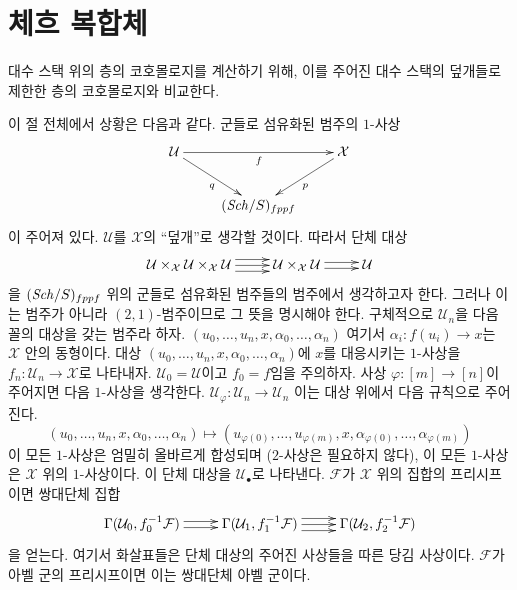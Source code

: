 \section{체흐 복합체}
\label{section-cech}

\noindent
대수 스택 위의 층의 코호몰로지를 계산하기 위해, 이를 주어진
대수 스택의 덮개들로 제한한 층의 코호몰로지와 비교한다.

\medskip\noindent
이 절 전체에서 상황은 다음과 같다. 군들로 섬유화된 범주의
$1$-사상
\begin{equation}
\label{equation-covering}
\vcenter{
\xymatrix{
\mathcal{U} \ar[rr]_f \ar[rd]_q & &  \mathcal{X} \ar[ld]^p \\
& (\Sch/S)_{fppf}
}
}
\end{equation}
이 주어져 있다. $\mathcal{U}$를 $\mathcal{X}$의 ``덮개''로
생각할 것이다. 따라서 단체 대상
$$
\xymatrix{
\mathcal{U} \times_\mathcal{X} \mathcal{U} \times_\mathcal{X} \mathcal{U}
\ar@<1ex>[r]
\ar@<0ex>[r]
\ar@<-1ex>[r]
&
\mathcal{U} \times_\mathcal{X} \mathcal{U}
\ar@<0.5ex>[r]
\ar@<-0.5ex>[r]
&
\mathcal{U}
}
$$
을 $(\mathit{Sch}/S)_{fppf}$ 위의 군들로 섬유화된 범주들의 범주에서
생각하고자 한다. 그러나 이는 범주가 아니라 $(2, 1)$-범주이므로
그 뜻을 명시해야 한다. 구체적으로 $\mathcal{U}_n$을
다음 꼴의 대상을 갖는 범주라 하자.
$(u_0, \ldots, u_n, x, \alpha_0, \ldots, \alpha_n)$
여기서 $\alpha_i : f(u_i) \to x$는 $\mathcal{X}$ 안의 동형이다.
대상 $(u_0, \ldots, u_n, x, \alpha_0, \ldots, \alpha_n)$에
$x$를 대응시키는 $1$-사상을
$f_n : \mathcal{U}_n \to \mathcal{X}$로 나타내자.
$\mathcal{U}_0 = \mathcal{U}$이고 $f_0 = f$임을 주의하자.
사상 $\varphi : [m] \to [n]$이 주어지면 다음 $1$-사상을 생각한다.
$\mathcal{U}_\varphi : \mathcal{U}_n \longrightarrow \mathcal{U}_n$
이는 대상 위에서 다음 규칙으로 주어진다.
$$
(u_0, \ldots, u_n, x, \alpha_0, \ldots, \alpha_n)
\longmapsto
(u_{\varphi(0)}, \ldots, u_{\varphi(m)}, x,
\alpha_{\varphi(0)}, \ldots, \alpha_{\varphi(m)})
$$
이 모든 $1$-사상은 엄밀히 올바르게 합성되며
($2$-사상은 필요하지 않다), 이 모든 $1$-사상은
$\mathcal{X}$ 위의 $1$-사상이다.
이 단체 대상을 $\mathcal{U}_\bullet$로 나타낸다.
$\mathcal{F}$가 $\mathcal{X}$ 위의 집합의 프리시프이면
쌍대단체 집합
$$
\xymatrix{
\Gamma(\mathcal{U}_0, f_0^{-1}\mathcal{F})
\ar@<0.5ex>[r]
\ar@<-0.5ex>[r]
&
\Gamma(\mathcal{U}_1, f_1^{-1}\mathcal{F})
\ar@<1ex>[r]
\ar@<0ex>[r]
\ar@<-1ex>[r]
&
\Gamma(\mathcal{U}_2, f_2^{-1}\mathcal{F})
}
$$
을 얻는다. 여기서 화살표들은 단체 대상의 주어진 사상들을 따른
당김 사상이다. $\mathcal{F}$가 아벨 군의 프리시프이면
이는 쌍대단체 아벨 군이다.

